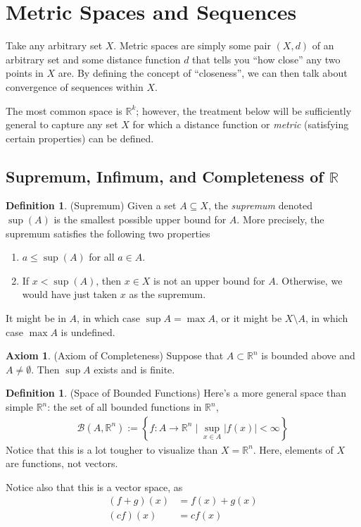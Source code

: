 \documentclass[12pt]{article}
\numberwithin{equation}{section} %
\theoremstyle{plain}
\theoremstyle{definition}
\newtheorem{ax}[thm]{Axiom}
\newtheorem{defn}[thm]{Definition}
\theoremstyle{remark}
\newcommand{\R}{\mathbb{R}}
\begin{document}
\clearpage
\section{Metric Spaces and Sequences}

Take any arbitrary set $X$. Metric spaces are simply some pair $(X,d)$
of an arbitrary set and some distance function $d$ that tells you ``how
close'' any two points in $X$ are. By defining the concept of
``closeness'', we can then talk about convergence of sequences within
$X$.

The most common space is $\R^k$; however, the treatment below
will be sufficiently general to capture any set $X$ for which a distance
function or \emph{metric} (satisfying certain properties) can be
defined.

\subsection{Supremum, Infimum, and Completeness of $\R$}


\begin{defn}{(Supremum)}
\label{defn:supdef1}
Given a set $A\subseteq X$, the \emph{supremum} denoted $\sup(A)$ is the
smallest possible upper bound for $A$.
More precisely, the supremum satisfies the following two properties
\begin{enumerate}
  \item $a\leq \sup(A)$ for all $a\in A$.
  \item If $x<\sup(A)$, then $x\in X$ is not an upper bound for $A$.
    Otherwise, we would have just taken $x$ as the supremum.
\end{enumerate}
It might be in $A$, in which case $\sup A = \max A$, or it might be
$X\setminus A$, in which case $\max A$ is undefined.
\end{defn}

\begin{ax}{(Axiom of Completeness)}
\label{ax:completeness}
Suppose that $A\subset \R^n$ is bounded above and $A\neq
\emptyset$. Then $\sup A$ exists and is finite.
\end{ax}

\begin{defn}{(Space of Bounded Functions)}
Here's a more general space than simple $\R^n$: the set of all
bounded functions in $\R^n$,
\begin{align*}
  \mathscr{B}(A,\R^n)
  :=
  \left\{
    f:A\rightarrow \R^n \; \big| \; \sup_{x\in A} |f(x)|<\infty
  \right\}
\end{align*}
Notice that this is a lot tougher to visualize than $X=\R^n$.
Here, elements of $X$ are functions, not vectors.

Notice also that this is a vector space, as
\begin{align*}
  (f+g)(x) &= f(x) + g(x)\\
  (cf)(x) &= cf(x)
\end{align*}
\end{defn}
\end{document}

